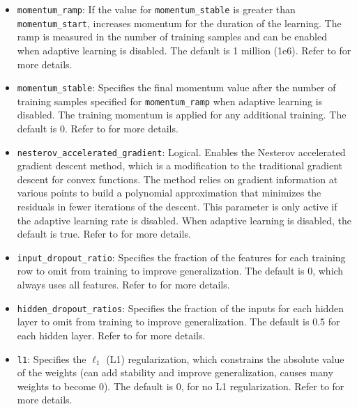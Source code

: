 {{\begin{itemize}
\item \texttt{momentum\_ramp}: If the value for \texttt{momentum\_stable} is greater than\\ \texttt{momentum\_start}, increases momentum for the duration of the learning.  The ramp is measured in the number of training samples and can be enabled when adaptive learning is disabled. The default is 1 million (1e6). Refer to {\textbf{}} for more details.

\item \texttt{momentum\_stable}: Specifies the final momentum value after the number of training samples specified for \texttt{momentum\_ramp} when adaptive learning is disabled. The training momentum is applied for any additional training. The default is 0.  Refer to {\textbf{}} for more details.

\item \texttt{nesterov\_accelerated\_gradient}:  Logical.  Enables the Nesterov accelerated gradient descent method, which is a modification to the traditional gradient descent for convex functions. The method relies on gradient information at various points to build a polynomial approximation that minimizes the residuals in fewer iterations of the descent. This parameter is only active if the adaptive learning rate is disabled.  When adaptive learning is disabled, the default is true. Refer to {\textbf{}} for more details.

\item \texttt{input\_dropout\_ratio}: Specifies the fraction of the features for each training row to omit from training to improve generalization. The default is 0, which always uses all features.  Refer to {\textbf{}} for more details.

\item \texttt{hidden\_dropout\_ratios}:  Specifies the fraction of the inputs for each hidden layer to omit from training to improve generalization. The default is 0.5 for each hidden layer.  Refer to {\textbf{}} for more details.

\item \texttt{l1}: Specifies the $\ell_1$ (L1) regularization, which constrains the absolute value of the weights (can add stability and improve generalization, causes many weights to become 0). The default is 0, for no L1 regularization. Refer to {\textbf{}} for more details.


\end{itemize}}}
